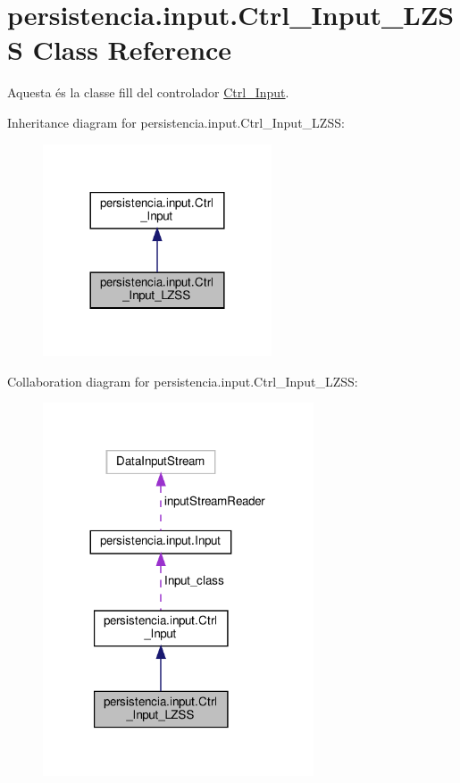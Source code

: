 \hypertarget{classpersistencia_1_1input_1_1Ctrl__Input__LZSS}{}\section{persistencia.\+input.\+Ctrl\+\_\+\+Input\+\_\+\+L\+Z\+SS Class Reference}
\label{classpersistencia_1_1input_1_1Ctrl__Input__LZSS}


Aquesta és la classe fill del controlador \hyperlink{classpersistencia_1_1input_1_1Ctrl__Input}{Ctrl\+\_\+\+Input}.  




Inheritance diagram for persistencia.\+input.\+Ctrl\+\_\+\+Input\+\_\+\+L\+Z\+SS\+:\nopagebreak
\begin{figure}[H]
\begin{center}
\leavevmode
\includegraphics[width=192pt]{classpersistencia_1_1input_1_1Ctrl__Input__LZSS__inherit__graph}
\end{center}
\end{figure}


Collaboration diagram for persistencia.\+input.\+Ctrl\+\_\+\+Input\+\_\+\+L\+Z\+SS\+:
\nopagebreak
\begin{figure}[H]
\begin{center}
\leavevmode
\includegraphics[width=227pt]{classpersistencia_1_1input_1_1Ctrl__Input__LZSS__coll__graph}
\end{center}
\end{figure}
